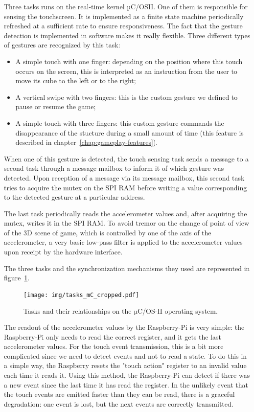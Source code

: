 \documentclass[english, DIV=13]{scrreprt}
\begin{document}
Three tasks runs on the real-time kernel µC/OSII. One of them is responsible
for sensing the touchscreen. It is implemented as a finite state machine periodically
refreshed at a sufficient rate to ensure responsiveness. The fact that the gesture
detection is implemented in software makes it really flexible. Three different types of
gestures are recognized by this task:
\begin{itemize}
    \item A simple touch with one finger: depending on the position where this touch
    occurs on the screen, this is interpreted as an instruction from the user to move
    its cube to the left or to the right;
    \item A vertical swipe with two fingers: this is the custom gesture we defined to
    pause or resume the game;
    \item A simple touch with three fingers: this custom gesture commands the
    disappearance of the stucture during a small amount of time (this feature is
    described in chapter~\ref{chap:gameplay-features}).
\end{itemize}
When one of this gesture is detected, the touch sensing task sends a
message to a second task through a message mailbox to inform it of which gesture
was detected. Upon reception of a message via its message mailbox, this second task
tries to acquire the mutex on the SPI RAM before writing a value corresponding
to the detected gesture at a particular address.

The last task periodically reads the accelerometer values and, after acquiring
the mutex, writes it in the SPI RAM. To avoid tremor on the change of point of
view of the 3D scene of game, which is controlled by one of the axis of the
accelerometer, a very basic low-pass filter is applied to the accelerometer
values upon receipt by the hardware interface.

The three tasks and the synchronization mechanisms they used are represented in
figure~\ref{fig:tasks-mc}.

\begin{figure}[bth]
    \centering
    \texttt{[image: img/tasks\_mC\_cropped.pdf]}
    \caption{Tasks and their relationships on the µC/OS-II operating system.}
    \label{fig:tasks-mc}
\end{figure}

The readout of the accelerometer values by the Raspberry-Pi is very simple:
the Raspberry-Pi only needs to read the correct register, and it gets the
last accelerometer values.
For the touch event transmission, this is a bit more complicated since we
need to detect events and not to read a state. To do this in a simple way,
the Raspberry resets the "touch action" register to an invalid value each
time it reads it. Using this method, the Raspberry-Pi can detect if there
was a new event since the last time it has read the register.
In the unlikely event that the touch events are emitted faster than they
can be read, there is a graceful degradation: one event is lost, but the
next events are correctly transmitted.
\end{document}
